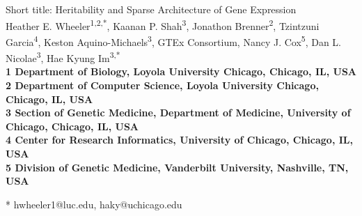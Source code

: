 \documentclass[10pt,letterpaper]{article}
\date{}
\begin{document}
\vspace*{0.35in}

\begin{flushleft}
{\Large
\textbf{}
}
\newline
\newline
Short title: Heritability and Sparse Architecture of Gene Expression
\newline
\\
Heather E. Wheeler\textsuperscript{1,2,*},
Kaanan P. Shah\textsuperscript{3},
Jonathon Brenner\textsuperscript{2},
Tzintzuni Garcia\textsuperscript{4},
Keston Aquino-Michaels\textsuperscript{3},
GTEx Consortium,
Nancy J. Cox\textsuperscript{5}, Dan L.
Nicolae\textsuperscript{3}, Hae Kyung Im\textsuperscript{3,*}
\\
\bigskip
\bf{1} Department of Biology, Loyola University Chicago, Chicago, IL, USA
\\
\bf{2} Department of Computer Science, Loyola University Chicago, Chicago, IL, USA
\\
\bf{3} Section of Genetic Medicine, Department of Medicine, University of Chicago, Chicago, IL, USA
\\
\bf{4} Center for Research Informatics, University of Chicago, Chicago, IL, USA
\\
\bf{5} Division of Genetic Medicine, Vanderbilt University, Nashville, TN, USA
\bigskip

% 
%





* hwheeler1@luc.edu, haky@uchicago.edu

\end{flushleft}
\end{document}
